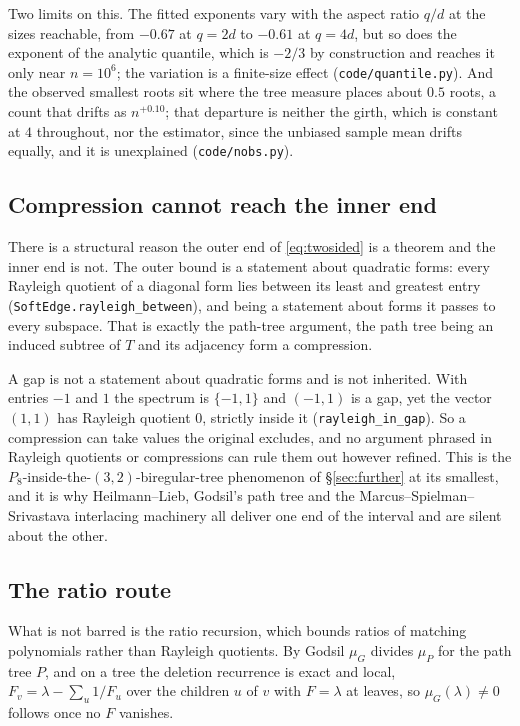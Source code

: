 \documentclass[11pt]{article}
\theoremstyle{remark}
\begin{document}
Two limits on this. The fitted exponents vary with the aspect ratio $q/d$ at the sizes reachable,
from $-0.67$ at $q=2d$ to $-0.61$ at $q=4d$, but so does the exponent of the analytic quantile,
which is $-2/3$ by construction and reaches it only near $n=10^6$; the variation is a finite-size
effect (\texttt{code/quantile.py}). And the observed smallest roots sit where the tree measure
places about $0.5$ roots, a count that drifts as $n^{+0.10}$; that departure is neither the girth,
which is constant at $4$ throughout, nor the estimator, since the unbiased sample mean drifts
equally, and it is unexplained (\texttt{code/nobs.py}).

\subsection{Compression cannot reach the inner end}\label{sec:barrier}

There is a structural reason the outer end of \eqref{eq:twosided} is a theorem and the inner end
is not. The outer bound is a statement about quadratic forms: every Rayleigh quotient of a
diagonal form lies between its least and greatest entry (\texttt{SoftEdge.rayleigh\_between}), and
being a statement about forms it passes to every subspace. That is exactly the path-tree
argument, the path tree being an induced subtree of $T$ and its adjacency form a compression.

A gap is not a statement about quadratic forms and is not inherited. With entries $-1$ and $1$
the spectrum is $\{-1,1\}$ and $(-1,1)$ is a gap, yet the vector $(1,1)$ has Rayleigh quotient
$0$, strictly inside it (\texttt{rayleigh\_in\_gap}). So a compression can take values the
original excludes, and no argument phrased in Rayleigh quotients or compressions can rule them
out however refined. This is the $P_8$-inside-the-$(3,2)$-biregular-tree phenomenon of
\S\ref{sec:further} at its smallest, and it is why Heilmann--Lieb, Godsil's path tree and the
Marcus--Spielman--Srivastava interlacing machinery all deliver one end of the interval and are
silent about the other.

\subsection{The ratio route}\label{sec:ratio}

What is not barred is the ratio recursion, which bounds ratios of matching polynomials rather
than Rayleigh quotients. By Godsil $\mu_G$ divides $\mu_P$ for the path tree $P$, and on a tree
the deletion recurrence is exact and local, $F_v=\lambda-\sum_u 1/F_u$ over the children $u$ of
$v$ with $F=\lambda$ at leaves, so $\mu_G(\lambda)\ne0$ follows once no $F$ vanishes.
\end{document}
